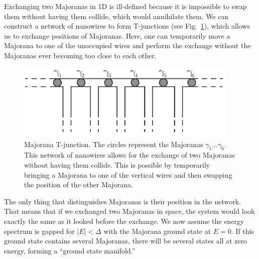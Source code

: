 Exchanging two Majoranas in 1D is ill-defined because it is impossible to swap them without having them collide, which would annihilate them.
We can construct a network of nanowires to form T-junctions (see Fig.~\ref{fig:Majorana-T-junction}), which allows us to exchange positions of Majoranas.
Here, one can temporarily move a Majorana to one of the unoccupied wires and perform the exchange without the Majoranas ever becoming too close to each other.
\begin{figure}
\begin{center}
\includegraphics[width=0.95\textwidth]{chapter_introduction/figures/T-junction-network.pdf}
\centering{}
\caption{Majorana T-junction.
The circles represent the Majoranas $\gamma_{1}...\gamma_{6}$.
This network of nanowires allows for the exchange of two Majoranas without having them collide.
This is possible by temporarily bringing a Majorana to one of the
vertical wires and then swapping the position of the other Majorana.
\label{fig:Majorana-T-junction}}
\end{center}
\end{figure}
The only thing that distinguishes Majoranas is their position in the network.
That means that if we exchanged two Majoranas in space, the system would look exactly the same as it looked before the exchange.
We now assume the energy spectrum is gapped for $|E|<\Delta$ with the Majorana ground state at $E=0$.
If this ground state contains several Majoranas, there will be several states all at zero energy, forming a ``ground state manifold.''

